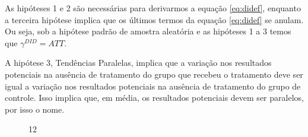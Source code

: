 \documentclass[portugues]{article}
\begin{document}
As hipóteses 1 e 2 são necessárias para derivarmos a equação \eqref{eq:didef}, enquanto a terceira hipótese implica que os últimos termos da equação \eqref{eq:didef} se anulam. Ou seja, sob a hipótese padrão de amostra aleatória e as hipóteses 1 a 3 temos que $\gamma^{DID} = ATT$.

A hipótese 3, Tendências Paralelas, implica que a variação nos resultados potenciais na ausência de tratamento do grupo que recebeu o tratamento deve ser igual a variação nos resultados potenciais na ausência de tratamento do grupo de controle. Isso implica que, em média, os resultados potenciais devem ser paralelos, por isso o nome. 

\begin{figure}[!htp]
    \centering
    \begin{animateinline}{12} %
    \end{animateinline}
\end{figure}
\end{document}
